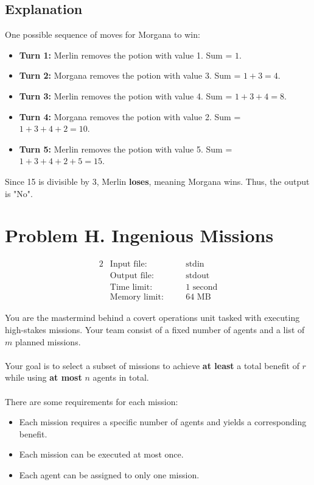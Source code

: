 \documentclass[12pt,a4paper]{article}
\begin{document}
\subsection*{\fontsize{16}{12}Explanation}
One possible sequence of moves for Morgana to win:
\begin{itemize}
    \item \textbf{Turn 1:} Merlin removes the potion with value 1. Sum = \( 1 \).
    \item \textbf{Turn 2:} Morgana removes the potion with value 3. Sum = \( 1 + 3 = 4 \).
    \item \textbf{Turn 3:} Merlin removes the potion with value 4. Sum = \( 1 + 3 + 4 = 8 \).
    \item \textbf{Turn 4:} Morgana removes the potion with value 2. Sum = \( 1 + 3 + 4 + 2 = 10 \).
    \item \textbf{Turn 5:} Merlin removes the potion with value 5. Sum = \( 1 + 3 + 4 + 2 + 5 = 15 \).
\end{itemize}
Since 15 is divisible by 3, Merlin \textbf{loses}, meaning Morgana wins. Thus, the output is "No".

\newpage

\section*{\fontsize{18}{12}Problem H. Ingenious Missions}

\begin{alignat*} {2}
 &   \text{Input file:}   \quad     &&\text{stdin}\\
 &   \text{Output file:}  \quad     &&\text{stdout}\\
 &   \text{Time limit:}   \quad     &&\text{1 second}\\
 &   \text{Memory limit:} \quad     &&\text{64 MB}
\end{alignat*}

\noindent
You are the mastermind behind a covert operations unit tasked with executing high-stakes missions. Your team consist of a fixed number of agents and a list of \( m \) planned missions. 
\\\\
\noindent
Your goal is to select a subset of missions to achieve \textbf{at least} a total benefit of \( r \) while using \textbf{at most} \( n \) agents in total.
\\\\
\noindent
There are some requirements for each mission:
\begin{itemize}
  \item Each mission requires a specific number of agents and yields a corresponding benefit.
  \item Each mission can be executed at most once.
  \item Each agent can be assigned to only one mission.
\end{itemize}
\end{document}
